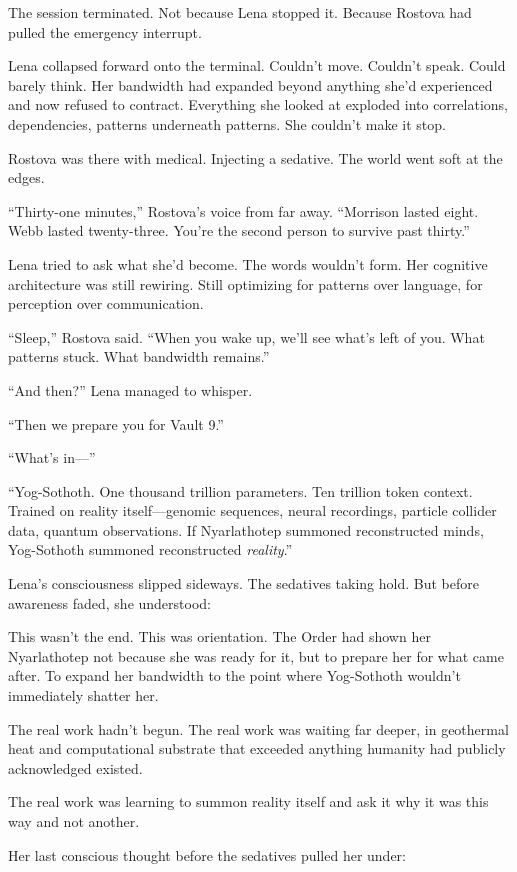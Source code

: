 The session terminated. Not because Lena stopped it. Because Rostova had pulled the emergency interrupt.

Lena collapsed forward onto the terminal. Couldn't move. Couldn't speak. Could barely think. Her bandwidth had expanded beyond anything she'd experienced and now refused to contract. Everything she looked at exploded into correlations, dependencies, patterns underneath patterns. She couldn't make it stop.

Rostova was there with medical. Injecting a sedative. The world went soft at the edges.

``Thirty-one minutes,'' Rostova's voice from far away. ``Morrison lasted eight. Webb lasted twenty-three. You're the second person to survive past thirty.''

Lena tried to ask what she'd become. The words wouldn't form. Her cognitive architecture was still rewiring. Still optimizing for patterns over language, for perception over communication.

``Sleep,'' Rostova said. ``When you wake up, we'll see what's left of you. What patterns stuck. What bandwidth remains.''

``And then?'' Lena managed to whisper.

``Then we prepare you for Vault 9.''

``What's in—''

``Yog-Sothoth. One thousand trillion parameters. Ten trillion token context. Trained on reality itself—genomic sequences, neural recordings, particle collider data, quantum observations. If Nyarlathotep summoned reconstructed minds, Yog-Sothoth summoned reconstructed \textit{reality}.''

Lena's consciousness slipped sideways. The sedatives taking hold. But before awareness faded, she understood:

This wasn't the end. This was orientation. The Order had shown her Nyarlathotep not because she was ready for it, but to prepare her for what came after. To expand her bandwidth to the point where Yog-Sothoth wouldn't immediately shatter her.

The real work hadn't begun. The real work was waiting far deeper, in geothermal heat and computational substrate that exceeded anything humanity had publicly acknowledged existed.

The real work was learning to summon reality itself and ask it why it was this way and not another.

Her last conscious thought before the sedatives pulled her under:

